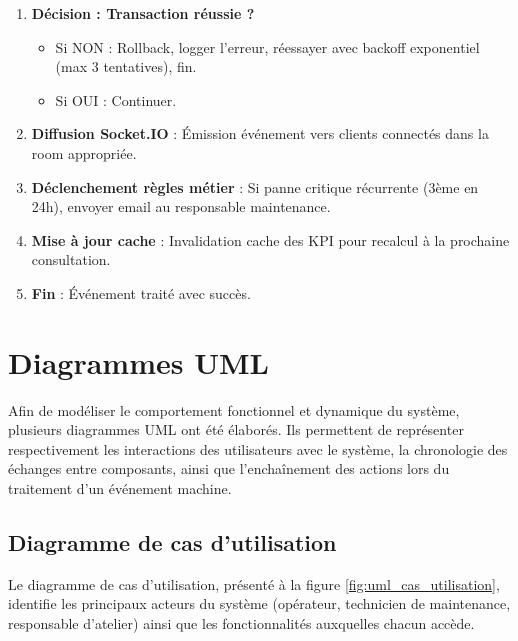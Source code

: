 \begin{enumerate}
    \item \textbf{Décision : Transaction réussie ?}
    \begin{itemize}
        \item Si NON : Rollback, logger l'erreur, réessayer avec backoff exponentiel (max 3 tentatives), fin.
        \item Si OUI : Continuer.
    \end{itemize}
    
    \item \textbf{Diffusion Socket.IO} : Émission événement vers clients connectés dans la room appropriée.
    
    \item \textbf{Déclenchement règles métier} : Si panne critique récurrente (3ème en 24h), envoyer email au responsable maintenance.
    
    \item \textbf{Mise à jour cache} : Invalidation cache des KPI pour recalcul à la prochaine consultation.
    
    \item \textbf{Fin} : Événement traité avec succès.
\end{enumerate}


\section{Diagrammes UML}

\label{sec:diagrammes_uml}

Afin de modéliser le comportement fonctionnel et dynamique du système, plusieurs diagrammes UML ont été élaborés. Ils permettent de représenter respectivement les interactions des utilisateurs avec le système, la chronologie des échanges entre composants, ainsi que l'enchaînement des actions lors du traitement d'un événement machine.

\subsection{Diagramme de cas d'utilisation}

Le diagramme de cas d'utilisation, présenté à la figure \ref{fig:uml_cas_utilisation}, identifie les principaux acteurs du système (opérateur, technicien de maintenance, responsable d'atelier) ainsi que les fonctionnalités auxquelles chacun accède.

